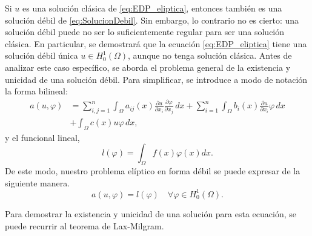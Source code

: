 \documentclass[a4paper,11pt,spanish, twoside, leqno]{tfg-uam}
\theoremstyle{definition}
\begin{document}
Si $u $ es una solución clásica de \eqref{eq:EDP_eliptica}, entonces también es una solución débil de \eqref{eq:SolucionDebil}. Sin embargo, lo contrario no es cierto: una solución débil puede no ser lo suficientemente regular para ser una solución clásica. En particular, se demostrará que la ecuación \eqref{eq:EDP_eliptica} tiene una solución débil única $u \in H^1_0(\Omega) $, aunque no tenga solución clásica. Antes de analizar este caso específico, se aborda el problema general de la existencia y unicidad de una solución débil. Para simplificar, se introduce a modo de notación la forma bilineal:
\begin{equation}
    \begin{aligned}
        a(u,\varphi) &= \sum_{i,j=1}^{n} \int_\Omega a_{ij}(x) \frac{\partial u}{\partial x_i} \frac{\partial \varphi}{\partial x_j}\,dx + \sum_{i=1}^{n} \int_\Omega b_i(x)\frac{\partial u}{\partial x_i} \varphi \,dx  \\ &+ \int_\Omega c(x)u \varphi \,dx,
    \end{aligned}
\end{equation}
y el funcional lineal,
\begin{equation}
    l(\varphi) = \int_\Omega f(x)\varphi(x) dx.
\end{equation}
De este modo, nuestro problema elíptico en forma débil se puede expresar de la siguiente manera.
\begin{equation}\label{eq:ProblemaDebilFormaBilineal}
    a(u,\varphi) = l(\varphi) \quad \forall \varphi\in H^1_0(\Omega).
\end{equation}

Para demostrar la existencia y unicidad de una solución para esta ecuación, se puede recurrir al teorema de Lax-Milgram. 
\end{document}
